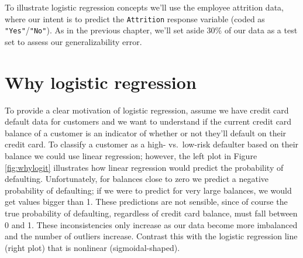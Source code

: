 \documentclass[]{krantz}
\makeatletter
\newenvironment{Shaded}{\begin{snugshade}}{\end{snugshade}}
\newcommand{\CommentTok}[1]{\textcolor[rgb]{0.37,0.37,0.37}{\textit{#1}}}
\newcommand{\DataTypeTok}[1]{\textcolor[rgb]{0.27,0.27,0.27}{#1}}
\newcommand{\DecValTok}[1]{\textcolor[rgb]{0.06,0.06,0.06}{#1}}
\newcommand{\FloatTok}[1]{\textcolor[rgb]{0.06,0.06,0.06}{#1}}
\newcommand{\KeywordTok}[1]{\textcolor[rgb]{0.27,0.27,0.27}{\textbf{#1}}}
\newcommand{\NormalTok}[1]{#1}
\newcommand{\OperatorTok}[1]{\textcolor[rgb]{0.43,0.43,0.43}{\textbf{#1}}}
\newcommand{\OtherTok}[1]{\textcolor[rgb]{0.37,0.37,0.37}{#1}}
\newcommand{\StringTok}[1]{\textcolor[rgb]{0.5,0.5,0.5}{#1}}
\newenvironment{kframe}{%
\medskip{}
\setlength{\fboxsep}{.8em}
 \def\at@end@of@kframe{}%
 \ifinner\ifhmode%
  \def\at@end@of@kframe{\end{minipage}}%
  \begin{minipage}{\columnwidth}%
 \fi\fi%
 \def\FrameCommand##1{\hskip\@totalleftmargin \hskip-\fboxsep
 \colorbox{shadecolor}{##1}\hskip-\fboxsep
     \hskip-\linewidth \hskip-\@totalleftmargin \hskip\columnwidth}%
 \MakeFramed {\advance\hsize-\width
   \@totalleftmargin\z@ \linewidth\hsize
   \@setminipage}}%
 {\par\unskip\endMakeFramed%
 \at@end@of@kframe}
\renewenvironment{Shaded}{\begin{kframe}}{\end{kframe}}
\makeatother
\begin{document}
To illustrate logistic regression concepts we'll use the employee attrition data, where our intent is to predict the \texttt{Attrition} response variable (coded as \texttt{"Yes"}/\texttt{"No"}). As in the previous chapter, we'll set aside 30\% of our data as a test set to assess our generalizability error.

\begin{Shaded}
\end{Shaded}

\hypertarget{why-logistic-regression}{%
\section{Why logistic regression}\label{why-logistic-regression}}

To provide a clear motivation of logistic regression, assume we have credit card default data for customers and we want to understand if the current credit card balance of a customer is an indicator of whether or not they'll default on their credit card. To classify a customer as a high- vs.~low-risk defaulter based on their balance we could use linear regression; however, the left plot in Figure \ref{fig:whylogit} illustrates how linear regression would predict the probability of defaulting. Unfortunately, for balances close to zero we predict a negative probability of defaulting; if we were to predict for very large balances, we would get values bigger than 1. These predictions are not sensible, since of course the true probability of defaulting, regardless of credit card balance, must fall between 0 and 1. These inconsistencies only increase as our data become more imbalanced and the number of outliers increase. Contrast this with the logistic regression line (right plot) that is nonlinear (sigmoidal-shaped).
\end{document}
